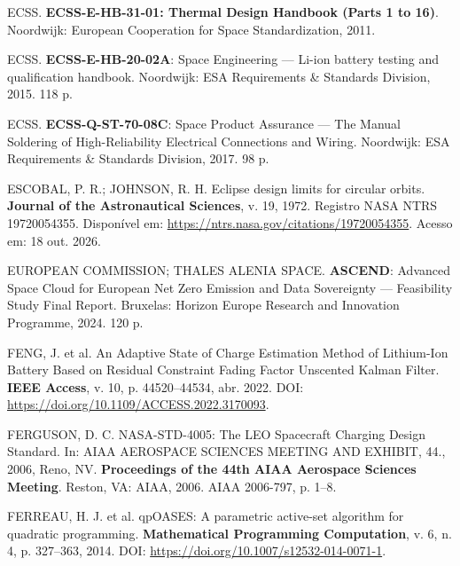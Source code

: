 \vspace{0.2cm}
\noindent ECSS. \textbf{ECSS-E-HB-31-01: Thermal Design Handbook (Parts 1 to 16)}. Noordwijk: European Cooperation for Space Standardization, 2011.

\vspace{0.2cm}
\noindent ECSS. \textbf{ECSS-E-HB-20-02A}: Space Engineering --- Li-ion battery testing and qualification handbook. Noordwijk: ESA Requirements \& Standards Division, 2015. 118 p.

\vspace{0.2cm}
\noindent ECSS. \textbf{ECSS-Q-ST-70-08C}: Space Product Assurance --- The Manual Soldering of High-Reliability Electrical Connections and Wiring. Noordwijk: ESA Requirements \& Standards Division, 2017. 98 p.

\vspace{0.2cm}
\noindent ESCOBAL, P. R.; JOHNSON, R. H. Eclipse design limits for circular orbits. \textbf{Journal of the Astronautical Sciences}, v. 19, 1972. Registro NASA NTRS 19720054355. Disponível em: \url{https://ntrs.nasa.gov/citations/19720054355}. Acesso em: 18 out. 2026.

\vspace{0.2cm}
\noindent EUROPEAN COMMISSION; THALES ALENIA SPACE. \textbf{ASCEND}: Advanced Space Cloud for European Net Zero Emission and Data Sovereignty --- Feasibility Study Final Report. Bruxelas: Horizon Europe Research and Innovation Programme, 2024. 120 p.

\vspace{0.2cm}
\noindent FENG, J. et al. An Adaptive State of Charge Estimation Method of Lithium-Ion Battery Based on Residual Constraint Fading Factor Unscented Kalman Filter. \textbf{IEEE Access}, v. 10, p. 44520--44534, abr. 2022. DOI: \url{https://doi.org/10.1109/ACCESS.2022.3170093}.

\vspace{0.2cm}
\noindent FERGUSON, D. C. NASA-STD-4005: The LEO Spacecraft Charging Design Standard. In: AIAA AEROSPACE SCIENCES MEETING AND EXHIBIT, 44., 2006, Reno, NV. \textbf{Proceedings of the 44th AIAA Aerospace Sciences Meeting}. Reston, VA: AIAA, 2006. AIAA 2006-797, p. 1--8.

\vspace{0.2cm}
\noindent FERREAU, H. J. et al. qpOASES: A parametric active-set algorithm for quadratic programming. \textbf{Mathematical Programming Computation}, v. 6, n. 4, p. 327--363, 2014. DOI: \url{https://doi.org/10.1007/s12532-014-0071-1}.


